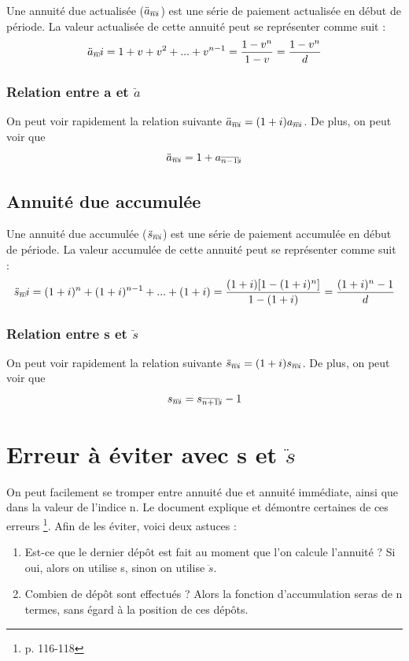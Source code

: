\documentclass[11pt,french]{report}
\makeatletter
\DeclareRobustCommand{\annuity}[1]{%
\def\arraystretch{0}%
\setlength\arraycolsep{.7pt}%
\setlength\arrayrulewidth{.3pt}%
\begin{array}[b]{@{}c|}\hline
\\[\arraycolsep]%
\scriptstyle #1%
\end{array}%
}
\makeatother
\begin{document}
Une annuité due actualisée ($\ddot{a}_{\annuity{n}i}$) est une série de paiement actualisée en début de période. La valeur actualisée de cette annuité peut se représenter comme suit :
\begin{equation}
\ddot{a}_{\annuity{n}}i = 1 + v + v^2 + ... + v^{n-1} = \frac{1 - v^n}{1 - v} = \frac{1 - v^n}{d}
\end{equation}

\subsubsection{Relation entre a et $\ddot{a}$}
\label{Relation 3.1}

On peut voir rapidement la relation suivante $\ddot{a}_{\annuity{n}i} = (1+i)a_{\annuity{n}i}$.
De plus, on peut voir que 
\begin{equation}
\ddot{a}_{\annuity{n}i} = 1 + a_{\annuity{n - 1}i}
\end{equation}

\subsection{Annuité due accumulée}

Une annuité due accumulée ($\ddot{s}_{\annuity{n}i}$) est une série de paiement accumulée en début de période. La valeur accumulée de cette annuité peut se représenter comme suit :
\begin{equation}
\ddot{s}_{\annuity{n}}i = (1+i)^n + (1+i)^{n-1} + ... + (1+i) = \frac{(1+i)[1-(1+i)^n]}{1 - (1+i)} = \frac{(1+i)^n - 1}{d}
\end{equation}

\subsubsection{Relation entre s et $\ddot{s}$}
\label{Relation 3.2}

On peut voir rapidement la relation suivante $\ddot{s}_{\annuity{n}i} = (1+i)s_{\annuity{n}i}$.
De plus, on peut voir que 
\begin{equation}
{s}_{\annuity{n}i} = s_{\annuity{n + 1}i} - 1
\end{equation}

\section{Erreur à éviter avec s et $\ddot{s}$}

On peut facilement se tromper entre annuité due et annuité immédiate, ainsi que dans la valeur de l'indice n. Le document explique et démontre certaines de ces erreurs \footnote{p. 116-118}.
Afin de les éviter, voici deux astuces :
\begin{enumerate}
\item Est-ce que le dernier dépôt est fait au moment que l'on calcule l'annuité ?
Si oui, alors on utilise s, sinon on utilise $\ddot{s}$.
\item Combien de dépôt sont effectués ? Alors la fonction d'accumulation seras de n termes, sans égard à la position de ces dépôts.
\end{enumerate}
\end{document}
